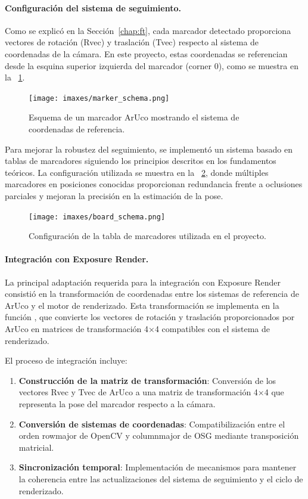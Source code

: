 \paragraph{Configuración del sistema de seguimiento.}
Como se explicó en la Sección~\ref{chap:ft}, cada marcador detectado proporciona vectores de rotación (Rvec) y traslación (Tvec) respecto al sistema de coordenadas de la cámara. En este proyecto, estas coordenadas se referencian desde la esquina superior izquierda del marcador (corner 0), como se muestra en la \figurename~\ref{fig:marker_schema}.

\begin{figure}
	\centering
	\texttt{[image: imaxes/marker\_schema.png]}
	\caption{Esquema de un marcador ArUco mostrando el sistema de coordenadas de referencia.}
	\label{fig:marker_schema}
\end{figure}

Para mejorar la robustez del seguimiento, se implementó un sistema basado en tablas de marcadores siguiendo los principios descritos en los fundamentos teóricos. La configuración utilizada se muestra en la \figurename~\ref{fig:board_schema}, donde múltiples marcadores en posiciones conocidas proporcionan redundancia frente a oclusiones parciales y mejoran la precisión en la estimación de la pose.

\begin{figure}
	\centering
	\texttt{[image: imaxes/board\_schema.png]}
	\caption{Configuración de la tabla de marcadores utilizada en el proyecto.}
	\label{fig:board_schema}
\end{figure}

\paragraph{Integración con Exposure Render.}
La principal adaptación requerida para la integración con Exposure Render consistió en la transformación de coordenadas entre los sistemas de referencia de ArUco y el motor de renderizado. Esta transformación se implementa en la función , que convierte los vectores de rotación y traslación proporcionados por ArUco en matrices de transformación 4×4 compatibles con el sistema de renderizado.

El proceso de integración incluye:
\begin{enumerate}
	\item \textbf{Construcción de la matriz de transformación}: Conversión de los vectores Rvec y Tvec de ArUco a una matriz de transformación 4×4 que representa la pose del marcador respecto a la cámara.
	\item \textbf{Conversión de sistemas de coordenadas}: Compatibilización entre el orden \gls{rowmajor} de OpenCV y \gls{columnmajor} de OSG mediante transposición matricial.
	\item \textbf{Sincronización temporal}: Implementación de mecanismos para mantener la coherencia entre las actualizaciones del sistema de seguimiento y el ciclo de renderizado.
\end{enumerate}

